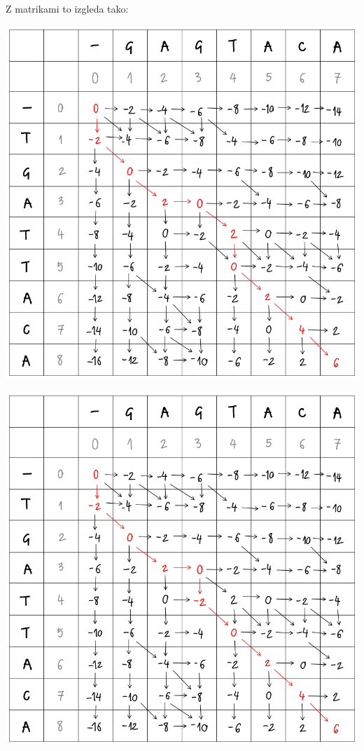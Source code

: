 \documentclass{article}
\begin{document}
\begin{enumerate}
\begin{enumerate}
				Z matrikami to izgleda tako:

				\begin{multicols}{2}
					\includegraphics[scale=0.25]{matrika-complete-2}

					\columnbreak

					\includegraphics[scale=0.25]{matrika-complete-3}
				\end{multicols}
		\end{enumerate}


\end{enumerate}
\end{document}
